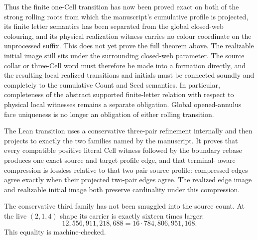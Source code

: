 Thus the finite one-Cell transition has now been proved exact on both of the
strong rolling roots from which the manuscript's cumulative profile is
projected, its finite letter semantics has been separated from the global
closed-web colouring, and its physical realization witness carries no colour
coordinate on the unprocessed suffix.  This does not yet prove the full
theorem above.  The realizable initial image still sits under the surrounding
closed-web parameter.  The source collar or three-Cell word must therefore be
made into a formation directly, and the resulting local realized transitions
and initials must be connected soundly and completely to the cumulative Count
and Seed semantics.  In particular, completeness of the abstract supported
finite-letter relation with respect to physical local witnesses remains a
separate obligation.  Global opened-annulus face uniqueness is no longer an
obligation of either rolling transition.

The Lean transition uses a conservative three-pair refinement internally and
then projects to exactly the two families named by the manuscript.  It proves
that every compatible positive literal Cell witness followed by the boundary
rebase produces one exact source and target profile edge, and that terminal-
aware compression is lossless relative to that two-pair source profile:
compressed edges agree exactly when their projected two-pair edges agree.
The realized edge image and realizable initial image both preserve cardinality
under this compression.

The conservative third family has not been smuggled into the source count.  At
the live $(2,1,4)$ shape its carrier is exactly sixteen times larger:
\[
  12{,}556{,}911{,}218{,}688
  =16\cdot784{,}806{,}951{,}168.
\]
This equality is machine-checked.

